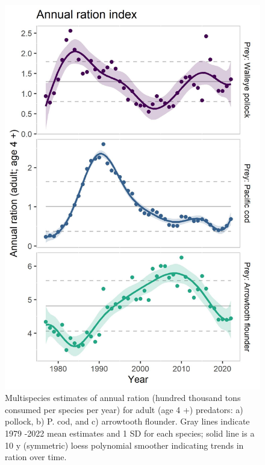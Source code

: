 \documentclass[
]{article}
\begin{document}
\begin{figure}
\centering
\includegraphics{Results/ESR_Fig4.jpg}
\caption{Multispecies estimates of annual ration (hundred thousand tons
consumed per species per year) for adult (age 4 +) predators: a)
pollock, b) P. cod, and c) arrowtooth flounder. Gray lines indicate 1979
-2022 mean estimates and 1 SD for each species; solid line is a 10 y
(symmetric) loess polynomial smoother indicating trends in ration over
time.}
\end{figure}
\end{document}
